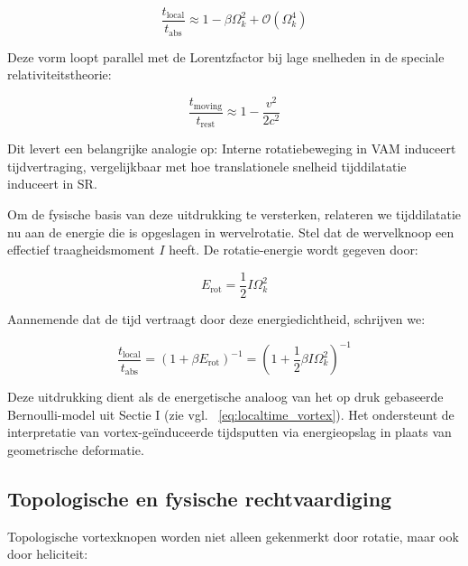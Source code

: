 \begin{equation}
\frac{t_{\text{local}}}{t_{\text{abs}}} \approx 1 - \beta \Omega_k^2 + \mathcal{O}(\Omega_k^4)\label{eq:rotational_induced_time_dilation_expansion}
\end{equation}

Deze vorm loopt parallel met de Lorentzfactor bij lage snelheden in de speciale relativiteitstheorie:

\begin{equation}
\frac{t_{\text{moving}}}{t_{\text{rest}}} \approx 1 - \frac{v^2}{2c^2}\label{eq:parallels_lorentz_time_dilation}
\end{equation}

Dit levert een belangrijke analogie op: Interne rotatiebeweging in VAM induceert tijdvertraging, vergelijkbaar met hoe translationele snelheid tijddilatatie induceert in SR.

Om de fysische basis van deze uitdrukking te versterken, relateren we tijddilatatie nu aan de energie die is opgeslagen in wervelrotatie. Stel dat de wervelknoop een effectief traagheidsmoment $I$ heeft. De rotatie-energie wordt gegeven door:

\begin{equation}
E_{\text{rot}} = \frac{1}{2} I \Omega_k^2\label{eq:rotational_energy_inertia}
\end{equation}

Aannemende dat de tijd vertraagt door deze energiedichtheid, schrijven we:

\begin{equation}
\frac{t_{\text{local}}}{t_{\text{abs}}} = \left(1 + \beta E_{\text{rot}} \right)^{-1} = \left(1 + \frac{1}{2} \beta I \Omega_k^2 \right)^{-1}\label{eq:time_dilation_rotational_energy_inertia}
\end{equation}

Deze uitdrukking dient als de energetische analoog van het op druk gebaseerde Bernoulli-model uit Sectie I (zie vgl. ~\eqref{eq:localtime_vortex}). Het ondersteunt de interpretatie van vortex-geïnduceerde tijdsputten via energieopslag in plaats van geometrische deformatie.

\subsection{Topologische en fysische rechtvaardiging}

Topologische vortexknopen worden niet alleen gekenmerkt door rotatie, maar ook door heliciteit:

